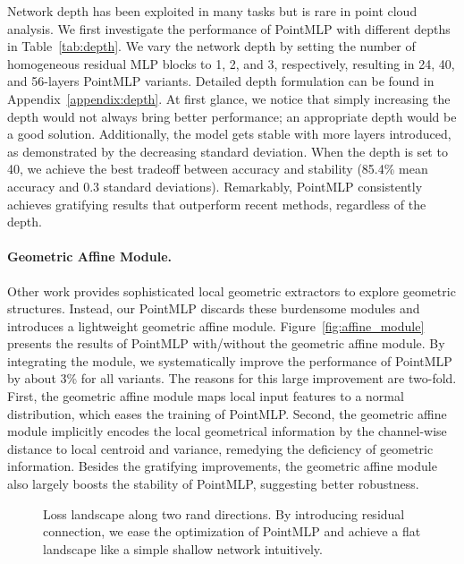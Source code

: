     
Network depth has been exploited in many tasks but is rare in point cloud analysis. We first investigate the performance of PointMLP with different depths in Table~\ref{tab:depth}. We vary the network depth by setting the number of homogeneous residual MLP blocks to 1, 2, and 3, respectively, resulting in 24, 40, and 56-layers PointMLP variants. Detailed depth formulation can be found in Appendix~\ref{appendix:depth}. At first glance, we notice that simply increasing the depth would not always bring better performance; an appropriate depth would be a good solution. Additionally, the model gets stable with more layers introduced, as demonstrated by the decreasing standard deviation. When the depth is set to 40, we achieve the best tradeoff between accuracy and stability (85.4\% mean accuracy and 0.3 standard deviations). Remarkably, PointMLP consistently achieves gratifying results that outperform recent methods, regardless of the depth. 

\paragraph{Geometric Affine Module.}  Other work provides sophisticated local geometric extractors to explore geometric structures. Instead, our PointMLP discards these burdensome modules and introduces a lightweight geometric affine module.
Figure~\ref{fig:affine_module} presents the results of PointMLP with/without the geometric affine module. By integrating the module, we systematically improve the performance of PointMLP by about 3\% for all variants. The reasons for this large improvement are two-fold. First, the geometric affine module maps local input features to a normal distribution, which eases the training of PointMLP. Second, the geometric affine module implicitly encodes the local geometrical information by the channel-wise distance to local centroid and variance, remedying the deficiency of geometric information. Besides the gratifying improvements, the geometric affine module also largely boosts the stability of PointMLP, suggesting better robustness.

\begin{wrapfigure}{r}{0.7\textwidth}
    \centering
        
    \vspace{-6mm}
    \hspace{3mm}
    \caption{
    Loss landscape along two rand directions. By introducing residual connection, we ease the optimization of PointMLP and achieve a flat landscape like a simple shallow network intuitively.  
    }
    \vspace{-3mm}
    \label{fig:losssurface}
\end{wrapfigure}

